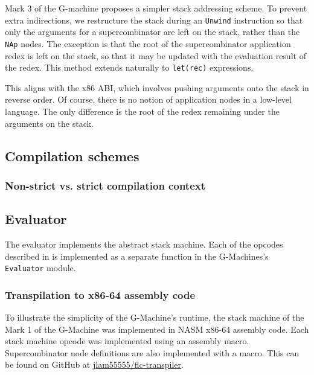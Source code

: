 Mark 3 of the G-machine proposes a simpler stack addressing scheme. To prevent extra indirections, we restructure the stack during an \texttt{Unwind} instruction so that only the arguments for a supercombinator are left on the stack, rather than the \texttt{NAp} nodes. The exception is that the root of the supercombinator application redex is left on the stack, so that it may be updated with the evaluation result of the redex. This method extends naturally to \texttt{let(rec)} expressions.

This aligns with the x86 ABI, which involves pushing arguments onto the stack in reverse order. Of course, there is no notion of application nodes in a low-level language. The only difference is the root of the redex remaining under the arguments on the stack.

\subsection{Compilation schemes}
\label{sec:compilation-schemes}


\subsubsection{Non-strict vs. strict compilation context}
\label{sec:strict-context}


\subsection{Evaluator}
\label{sec:evaluator}

The evaluator implements the abstract stack machine. Each of the opcodes described in  is implemented as a separate function in the G-Machines's \texttt{Evaluator} module.

\subsubsection{Transpilation to x86-64 assembly code}
\label{sec:gm-transpile-x86}

To illustrate the simplicity of the G-Machine's runtime, the stack machine of the Mark 1 of the G-Machine was implemented in NASM x86-64 assembly code. Each stack machine opcode was implemented using an assembly macro. Supercombinator node definitions are also implemented with a macro. This can be found on GitHub at \href{https://github.com/jlam55555/flc-transpiler}{jlam55555/flc-transpiler}.

